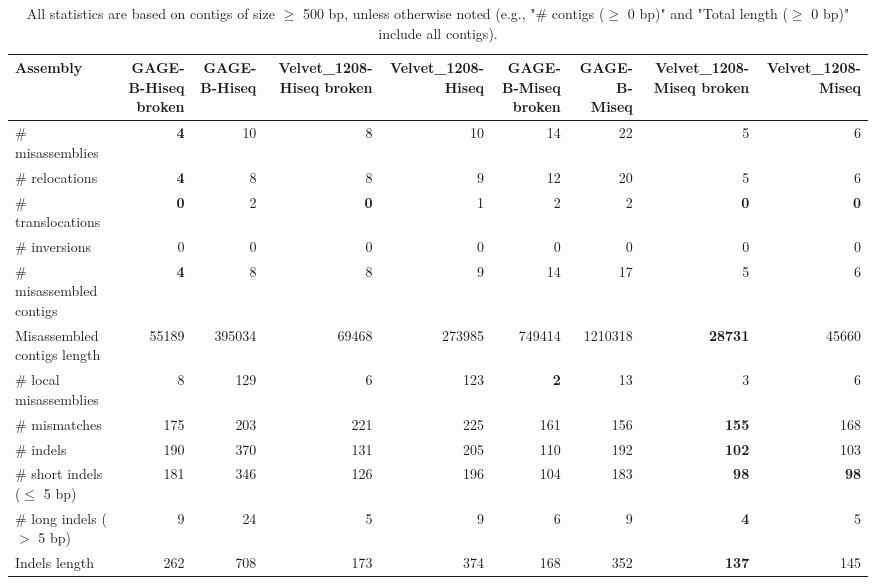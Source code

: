 \documentclass[12pt,a4paper]{article}
\begin{document}
\begin{table}[ht]
\begin{center}
\caption{All statistics are based on contigs of size $\geq$ 500 bp, unless otherwise noted (e.g., "\# contigs ($\geq$ 0 bp)" and "Total length ($\geq$ 0 bp)" include all contigs).}
\begin{tabular}{|l*{8}{|r}|}
\hline
Assembly & GAGE-B-Hiseq broken & GAGE-B-Hiseq & Velvet\_1208-Hiseq broken & Velvet\_1208-Hiseq & GAGE-B-Miseq broken & GAGE-B-Miseq & Velvet\_1208-Miseq broken & Velvet\_1208-Miseq \\ \hline
\# misassemblies & {\bf 4} & 10 & 8 & 10 & 14 & 22 & 5 & 6 \\ \hline
\hspace{5mm}\# relocations & {\bf 4} & 8 & 8 & 9 & 12 & 20 & 5 & 6 \\ \hline
\hspace{5mm}\# translocations & {\bf 0} & 2 & {\bf 0} & 1 & 2 & 2 & {\bf 0} & {\bf 0} \\ \hline
\hspace{5mm}\# inversions & 0 & 0 & 0 & 0 & 0 & 0 & 0 & 0 \\ \hline
\# misassembled contigs & {\bf 4} & 8 & 8 & 9 & 14 & 17 & 5 & 6 \\ \hline
Misassembled contigs length & 55189 & 395034 & 69468 & 273985 & 749414 & 1210318 & {\bf 28731} & 45660 \\ \hline
\# local misassemblies & 8 & 129 & 6 & 123 & {\bf 2} & 13 & 3 & 6 \\ \hline
\# mismatches & 175 & 203 & 221 & 225 & 161 & 156 & {\bf 155} & 168 \\ \hline
\# indels & 190 & 370 & 131 & 205 & 110 & 192 & {\bf 102} & 103 \\ \hline
\hspace{5mm}\# short indels ($\leq$ 5 bp) & 181 & 346 & 126 & 196 & 104 & 183 & {\bf 98} & {\bf 98} \\ \hline
\hspace{5mm}\# long indels ($>$ 5 bp) & 9 & 24 & 5 & 9 & 6 & 9 & {\bf 4} & 5 \\ \hline
Indels length & 262 & 708 & 173 & 374 & 168 & 352 & {\bf 137} & 145 \\ \hline
\end{tabular}
\end{center}
\end{table}
\end{document}
